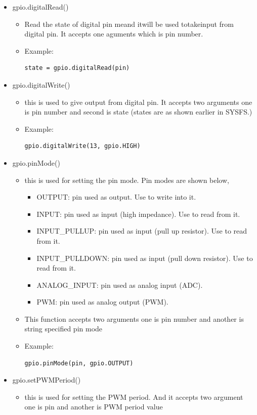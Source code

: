 \documentclass[11pt,a4paper]{article}
\begin{document}
\begin{itemize}
\begin{itemize}
\end{itemize}
\item 	gpio.digitalRead()
\begin{itemize}
\item	Read the state of digital pin meand itwill be used totakeinput from digital pin. It accepts one aguments which is pin number.
\item Example:
\begin{lstlisting}
state = gpio.digitalRead(pin) 
\end{lstlisting}

\end{itemize}
\item 	gpio.digitalWrite()
\begin{itemize}
\item	this is used to give output from digital pin. It accepts two arguments one is pin number and second is state (states are as shown earlier in SYSFS.)
\item Example:
\begin{lstlisting}
gpio.digitalWrite(13, gpio.HIGH) 
\end{lstlisting}

\end{itemize}
\item 	gpio.pinMode()
\begin{itemize}
\item	this is used for setting the pin mode. Pin modes are shown  below,
\begin{itemize}
\item OUTPUT: pin used as output. Use to write into it.
\item INPUT: pin used as input (high impedance). Use to read from it.
\item INPUT\_PULLUP: pin used as input (pull up resistor). Use to read from it.
\item INPUT\_PULLDOWN: pin used as input (pull down resistor). Use to read from it.
\item ANALOG\_INPUT: pin used as analog input (ADC).
\item PWM: pin used as analog output (PWM).
\end{itemize}
\item This function accepts two arguments one is pin number and another is string specified pin mode
\item Example:
\begin{lstlisting}
gpio.pinMode(pin, gpio.OUTPUT)
\end{lstlisting}

\end{itemize}
\item 	gpio.setPWMPeriod()
\begin{itemize}
\item	this is used for setting the PWM period. And it accepts two argument one is pin and another is PWM period value


\end{itemize}
\end{itemize}
\end{document}

